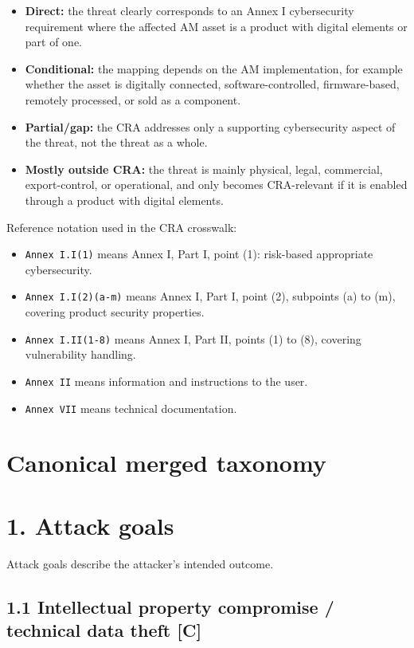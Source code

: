 \documentclass[10pt,a4paper,oneside]{report}
\begin{document}
\begin{itemize}
\item \textbf{Direct:} the threat clearly corresponds to an Annex I cybersecurity requirement where the affected AM asset is a product with digital elements or part of one.
\item \textbf{Conditional:} the mapping depends on the AM implementation, for example whether the asset is digitally connected, software-controlled, firmware-based, remotely processed, or sold as a component.
\item \textbf{Partial/gap:} the CRA addresses only a supporting cybersecurity aspect of the threat, not the threat as a whole.
\item \textbf{Mostly outside CRA:} the threat is mainly physical, legal, commercial, export-control, or operational, and only becomes CRA-relevant if it is enabled through a product with digital elements.
\end{itemize}

Reference notation used in the CRA crosswalk:

\begin{itemize}
\item \texttt{Annex I.I(1)} means Annex I, Part I, point (1): risk-based appropriate cybersecurity.
\item \texttt{Annex I.I(2)(a-m)} means Annex I, Part I, point (2), subpoints (a) to (m), covering product security properties.
\item \texttt{Annex I.II(1-8)} means Annex I, Part II, points (1) to (8), covering vulnerability handling.
\item \texttt{Annex II} means information and instructions to the user.
\item \texttt{Annex VII} means technical documentation.
\end{itemize}


\chapter{Canonical merged taxonomy}



\chapter{1. Attack goals}


Attack goals describe the attacker's intended outcome.


\section{1.1 Intellectual property compromise / technical data theft [C]}
\end{document}
